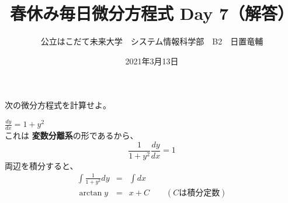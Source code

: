 \documentclass[dvipdfmx,uplatex]{jsarticle}
\title{春休み毎日微分方程式 Day 7（解答）}
\author{公立はこだて未来大学　システム情報科学部　B2　日置竜輔}
\date{2021年3月13日}
\begin{document}
\begin{spacing}{1.6}
\maketitle

次の微分方程式を計算せよ。
\begin{qparts}
    \qpart $ \displaystyle \frac{dy}{dx} = 1 + y ^ 2 $ \\
    これは {\bf 変数分離系}の形であるから、\\
    \begin{equation*}
      \frac{1}{1 + y ^ 2} \frac{dy}{dx} = 1
    \end{equation*}
    両辺を積分すると、\\
    \begin{eqnarray*}
      \int \frac{1}{1 + y ^ 2}dy & = & \int dx \\
      \arctan y & = & x + C \qquad (Cは積分定数)
    \end{eqnarray*}

    \newpage


\end{qparts}
\end{spacing}
\end{document}
